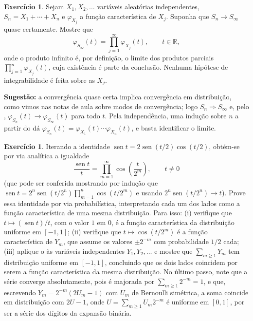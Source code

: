 \documentclass[12pt,portuguese]{article}
\theoremstyle{definition}
\theoremstyle{plainexercise}
\theoremstyle{starredexercise}
\newtheorem{starredexercise}[exercise]{Exercício}
\theoremstyle{definition}
\renewcommand{\sin}{\operatorname{sen}}
\begin{document}
\begin{starredexercise}\label{exercise:produto-infinito-qc}
Sejam $X_1,X_2,\dots$ variáveis aleatórias independentes, $S_n=X_1+\cdots+X_n$
e $\varphi_{X_j}$ a função característica de $X_j$. Suponha que $S_n\to S_\infty$
quase certamente. Mostre que
\[
  \varphi_{S_\infty}(t)=\prod_{j=1}^{\infty}\varphi_{X_j}(t),
  \qquad t\in\mathbb{R},
\]
onde o produto infinito é, por definição, o limite dos produtos parciais
$\prod_{j=1}^{n}\varphi_{X_j}(t)$, cuja existência é parte da conclusão. Nenhuma
hipótese de integrabilidade é feita sobre as $X_j$.

\noindent\textbf{Sugestão:} a convergência quase certa implica convergência em
distribuição, como vimos nas notas de aula sobre modos de convergência; logo
$S_n\Rightarrow S_\infty$ e, pelo ,
$\varphi_{S_n}(t)\to\varphi_{S_\infty}(t)$ para todo $t$. Pela independência,
uma indução sobre $n$ a partir do  dá
$\varphi_{S_n}(t)=\varphi_{X_1}(t)\cdots\varphi_{X_n}(t)$, e basta identificar o limite.
\end{starredexercise}

\begin{starredexercise}\label{exercise:produto-cossenos}
Iterando a identidade $\sin t=2\sin(t/2)\cos(t/2)$, obtém-se por via analítica
a igualdade
\[
  \frac{\sin t}{t}=\prod_{m=1}^{\infty}\cos\!\left(\frac{t}{2^{m}}\right),
  \qquad t\neq0
\]
(que pode ser conferida mostrando por indução que
$\sin t=2^{n}\sin(t/2^{n})\prod_{m=1}^{n}\cos(t/2^{m})$ e usando
$2^{n}\sin(t/2^{n})\to t$). Prove essa identidade por via probabilística,
interpretando cada um dos lados como a função característica de uma mesma
distribuição. Para isso: (i) verifique que $t\mapsto(\sin t)/t$, com o valor $1$
em $0$, é a função característica da distribuição uniforme em $[-1,1]$;
(ii) verifique que $t\mapsto\cos(t/2^{m})$ é a função característica de $Y_m$,
que assume os valores $\pm2^{-m}$ com probabilidade $1/2$ cada; (iii) aplique o
 às variáveis independentes $Y_1,Y_2,\dots$ e
mostre que $\sum_{m\geqslant1}Y_m$ tem distribuição uniforme em $[-1,1]$,
concluindo que os dois lados coincidem por serem a função característica da
mesma distribuição. No último passo, note que a série converge absolutamente,
pois é majorada por $\sum_{m\geqslant1}2^{-m}=1$, e que, escrevendo
$Y_m=2^{-m}(2U_m-1)$ com $U_m$ de Bernoulli simétrica, a soma coincide em
distribuição com $2U-1$, onde $U=\sum_{m\geqslant1}U_m2^{-m}$ é uniforme em
$[0,1]$, por ser a série dos dígitos da expansão binária.
\end{starredexercise}
\end{document}
